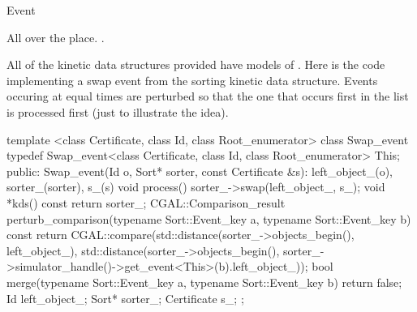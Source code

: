 \begin{ccRefConcept}{Event}


\ccHasModels

All over the place. .

\ccSeeAlso


\ccExample

All of the kinetic data structures provided have models of
\ccRefName. Here is the code implementing a swap event from the
sorting kinetic data structure. Events occuring at equal times are
perturbed so that the one that occurs first in the list is processed
first (just to illustrate the idea).

\begin{ccExampleCode}
template <class Certificate, class Id, class Root_enumerator> 
class Swap_event {
  typedef Swap_event<class Certificate, class Id, class Root_enumerator> This;
public:
  Swap_event(Id o, Sort* sorter, 
	     const Certificate &s): left_object_(o), 
                                    sorter_(sorter), 
                                    s_(s){}
  void process(){
    sorter_->swap(left_object_, s_);
  }
  void *kds() const {return sorter_;}
  CGAL::Comparison_result perturb_comparison(typename Sort::Event_key a, typename Sort::Event_key b) const {
    return CGAL::compare(std::distance(sorter_->objects_begin(), left_object_),
                         std::distance(sorter_->objects_begin(),
			               sorter_->simulator_handle()->get_event<This>(b).left_object_));
  }
  bool merge(typename Sort::Event_key a, typename Sort::Event_key b) {
    return false;
  }
  Id left_object_; 
  Sort* sorter_; 
  Certificate s_;
};
\end{ccExampleCode}


\end{ccRefConcept}


